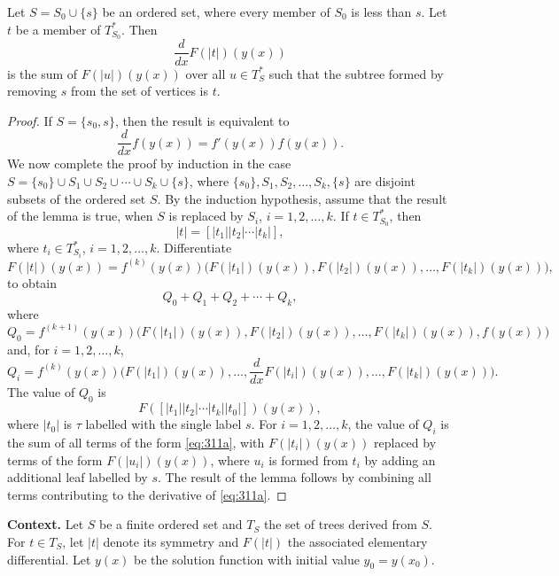 \begin{lemma}

  \label{lem:311A}
Let $S = S_0 \cup \{s\}$ be an ordered set, where every member of $S_0$ is less than $s$. Let $t$ be a member of $T_{S_0}^*$. Then
\[
\frac{d}{dx} F(|t|)(y(x))
\]
is the sum of $F(|u|)(y(x))$ over all $u \in T_S^*$ such that the subtree formed by removing $s$ from the set of vertices is $t$.
\end{lemma}

\begin{proof}
If $S = \{s_0, s\}$, then the result is equivalent to
\[
\frac{d}{dx} f(y(x)) = f'(y(x)) f(y(x)).
\]
We now complete the proof by induction in the case $S = \{s_0\} \cup S_1 \cup S_2 \cup \cdots \cup S_k \cup \{s\}$, where $\{s_0\}, S_1, S_2, \dots, S_k, \{s\}$ are disjoint subsets of the ordered set $S$. By the induction hypothesis, assume that the result of the lemma is true, when $S$ is replaced by $S_i$, $i = 1, 2, \dots, k$. If $t \in T_{S_0}^*$, then
\[
|t| = [|t_1| |t_2| \cdots |t_k|],
\]
where $t_i \in T_{S_i}^*$, $i = 1, 2, \dots, k$. Differentiate
\[
F(|t|)(y(x)) = f^{(k)}(y(x)) \bigl( F(|t_1|)(y(x)), F(|t_2|)(y(x)), \dots, F(|t_k|)(y(x)) \bigr), \tag{311a}
\]
to obtain
\[
Q_0 + Q_1 + Q_2 + \cdots + Q_k,
\]
where
\[
Q_0 = f^{(k+1)}(y(x)) \bigl( F(|t_1|)(y(x)), F(|t_2|)(y(x)), \dots, F(|t_k|)(y(x)), f(y(x)) \bigr)
\]
and, for $i = 1, 2, \dots, k$,
\[
Q_i = f^{(k)}(y(x)) \bigl( F(|t_1|)(y(x)), \dots, \frac{d}{dx} F(|t_i|)(y(x)), \dots, F(|t_k|)(y(x)) \bigr).
\]
The value of $Q_0$ is
\[
F([|t_1| |t_2| \cdots |t_k| |t_0|])(y(x)),
\]
where $|t_0|$ is $\tau$ labelled with the single label $s$. For $i = 1, 2, \dots, k$, the value of $Q_i$ is the sum of all terms of the form \eqref{eq:311a}, with $F(|t_i|)(y(x))$ replaced by terms of the form $F(|u_i|)(y(x))$, where $u_i$ is formed from $t_i$ by adding an additional leaf labelled by $s$. The result of the lemma follows by combining all terms contributing to the derivative of \eqref{eq:311a}.
\end{proof}

\noindent\textbf{Context.}
Let $S$ be a finite ordered set and $T_S$ the set of trees derived from $S$. For $t \in T_S$, let $|t|$ denote its symmetry and $F(|t|)$ the associated elementary differential. Let $y(x)$ be the solution function with initial value $y_0 = y(x_0)$.

